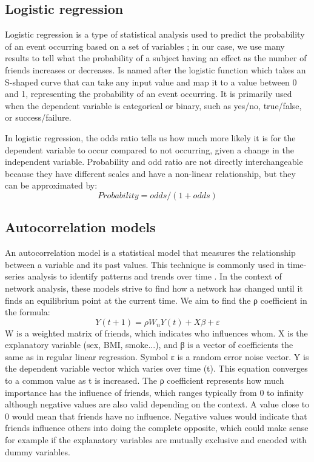 \subsection{Logistic regression}

Logistic regression is a type of statistical analysis used to predict the probability of an event occurring based on a set of variables \cite{Bewick2005}; in our case, we use many results to tell what the probability of a subject having an effect as the number of friends increases or decreases. Is named after the logistic function which takes an S-shaped curve that can take any input value and map it to a value between 0 and 1, representing the probability of an event occurring. It is primarily used when the dependent variable is categorical or binary, such as yes/no, true/false, or success/failure.

In logistic regression, the odds ratio tells us how much more likely it is for the dependent variable to occur compared to not occurring, given a change in the independent variable. Probability and odd ratio are not directly interchangeable because they have different scales and have a non-linear relationship, but they can be approximated by:
\begin{equation}
    Probability = odds / (1 + odds)
\end{equation}

\subsection{Autocorrelation models}

An autocorrelation model is a statistical model that measures the relationship between a variable and its past values. This technique is commonly used in time-series analysis to identify patterns and trends over time \cite{anselin1988spatial}. In the context of network analysis, these models \cite{OMalley2008} strive to find how a network has changed until it finds an equilibrium point at the current time. We aim to find the ρ coefficient in the formula:
    \begin{equation}
        Y(t+1) = ρW_nY(t) + Xβ + ε
    \end{equation}
W is a weighted matrix of friends, which indicates who influences whom. X is the explanatory variable (sex, BMI, smoke...), and β is a vector of coefficients the same as in regular linear regression. Symbol ε is a random error noise vector. Y is the dependent variable vector which varies over time (t). This equation converges to a common value as t is increased. The ρ coefficient represents how much importance has the influence of friends, which ranges typically from 0 to infinity although negative values are also valid depending on the context. A value close to 0 would mean that friends have no influence. Negative values would indicate that friends influence others into doing the complete opposite, which could make sense for example if the explanatory variables are mutually exclusive and encoded with dummy variables.